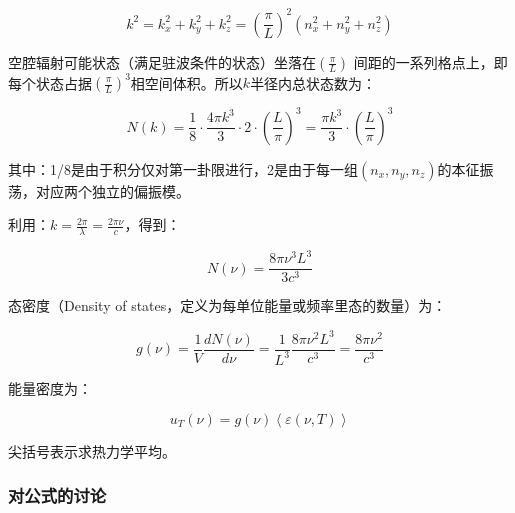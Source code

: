 \begin{equation}
k^2  = k_x ^2  + k_y ^2  + k_z ^2  = \left( {\frac{\pi }{L}} \right)^2 \left( {n_x ^2  + n_y ^2  + n_z ^2 } \right)
\end{equation}

空腔辐射可能状态（满足驻波条件的状态）坐落在$\left( {\frac{\pi }{L}} \right)$
间距的一系列格点上，即每个状态占据$\left( {\frac{\pi }{L}} \right)^3 $相空间体积。所以$k$半径内总状态数为：

\begin{equation}
N(k) = \frac{1}{8} \cdot \frac{{4\pi k^3 }}{3} \cdot 2 \cdot \left( {\frac{L}{\pi }} \right)^3 = \frac{{\pi k^3 }}{3} \cdot \left( {\frac{L}{\pi }} \right)^3 
\end{equation}

其中：1/8是由于积分仅对第一卦限进行，2是由于每一组$(n_x, n_y, n_z)$的本征振荡，对应两个独立的偏振模。

利用：$k = \frac{{2\pi }}{\lambda } = \frac{{2\pi \nu }}{c}$，得到：

\begin{equation}
N(\nu ) = \frac{{8\pi \nu ^3 L^3 }}{{3c^3 }}
\end{equation}

态密度（Density of states，定义为每单位能量或频率里态的数量）为：

\begin{equation}
g(\nu ) = \frac{1}{V}\frac{{dN(\nu )}}{{d\nu }} = \frac{1}{{L^3 }}\frac{{8\pi \nu ^2 L^3 }}{{c^3 }} = \frac{{8\pi \nu ^2 }}{{c^3 }}
\end{equation}

能量密度为：

\begin{equation}
u_T (\nu ) = g(\nu )\left\langle {\varepsilon (\nu ,T)} \right\rangle
\end{equation}

尖括号表示求热力学平均。

\subsubsection*{对公式的讨论}

